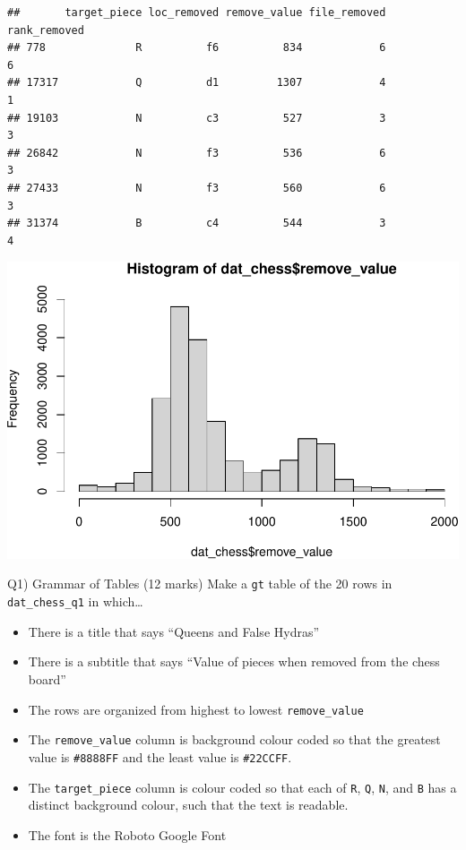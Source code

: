 \documentclass[
]{article}
\newenvironment{Shaded}{\begin{snugshade}}{\end{snugshade}}
\newcommand{\FunctionTok}[1]{\textcolor[rgb]{0.13,0.29,0.53}{\textbf{#1}}}
\newcommand{\NormalTok}[1]{#1}
\newcommand{\SpecialCharTok}[1]{\textcolor[rgb]{0.81,0.36,0.00}{\textbf{#1}}}
\providecommand{\tightlist}{%
  \setlength{\itemsep}{0pt}\setlength{\parskip}{0pt}}
\begin{document}
\begin{verbatim}
##       target_piece loc_removed remove_value file_removed rank_removed
## 778              R          f6          834            6            6
## 17317            Q          d1         1307            4            1
## 19103            N          c3          527            3            3
## 26842            N          f3          536            6            3
## 27433            N          f3          560            6            3
## 31374            B          c4          544            3            4
\end{verbatim}

\begin{Shaded}
\end{Shaded}

\includegraphics{STAT842_Assignment2_files/figure-latex/unnamed-chunk-2-1.pdf}

\newpage

Q1) Grammar of Tables (12 marks) Make a \texttt{gt} table of the 20 rows
in \texttt{dat\_chess\_q1} in which\ldots{}

\begin{itemize}
\tightlist
\item
  There is a title that says ``Queens and False Hydras''
\item
  There is a subtitle that says ``Value of pieces when removed from the
  chess board''
\item
  The rows are organized from highest to lowest \texttt{remove\_value}
\item
  The \texttt{remove\_value} column is background colour coded so that
  the greatest value is \texttt{\#8888FF} and the least value is
  \texttt{\#22CCFF}.
\item
  The \texttt{target\_piece} column is colour coded so that each of
  \texttt{R}, \texttt{Q}, \texttt{N}, and \texttt{B} has a distinct
  background colour, such that the text is readable.
\item
  The font is the Roboto Google Font
\end{itemize}
\end{document}
